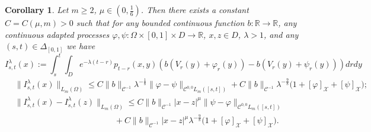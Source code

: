 \documentclass[12pt]{article}
\newtheorem{corollary}[theorem]{Corollary}
\theoremstyle{definition}
\DeclareMathOperator{\1}{\mathbbm{1}}%
\def\phi{\varphi}
\renewcommand{\ge}{\geqslant}
\renewcommand{\le}{\leqslant}
\newcommand{\nn}{\nonumber}
\newcommand{\C}{\mathcal{C}}
\newcommand{\R}{\mathbb{R}}
\newcommand{\X}{\mathcal{X}}
\begin{document}
\begin{corollary}\label{c:finfin}
Let  $m\ge2$, $\mu\in(0,\frac16)$. Then there exists a constant $C=C(\mu,m)>0$ such that for any bounded continuous function $b\colon\R\to\R$, any continuous adapted processes  $\phi,\psi \colon\Omega\times[0,1]\times D\to\R$, $x,z\in D$, $\lambda>1$, and any  $(s,t)\in\Delta_{[0,1]}$ we have
\[
I_{s,t}^\lambda(x):=\int_s^t\int_ D e^{-\lambda(t-r)}p_{t-r}(x,y)\left(b( V_r(y)+\phi_r(y))- b( V_r(y)+\psi_r(y))\right)drd y
\]
\begin{align}\label{keylam}
&\|I_{s,t}^\lambda(x)\|_{L_m(\Omega)}\le 
C \|b\|_{\C^{-1}}                                                                                                                                               \lambda^{-\frac18}\|\phi-\psi\|_{\C^{0,0}L_m([s,t])}+C \|b\|_{\C^{-1}}\lambda^{-\frac{9}8}\bigl(1+[\phi]_{\X}+[\psi]_{\X}\bigr);\\
&\|I_{s,t}^\lambda(x)-I_{s,t}^\lambda(z)\|_{L_m(\Omega)}\le  C \|b\|_{\C^{-1}} |x-z|^\mu                                                                                                                                                      \|\psi-\phi\|_{\C^{0,0}L_m([s,t])}\nn\\
 &\qquad\qquad \qquad \qquad\qquad \qquad+ C \|b\|_{\C^{-1}}  |x-z|^\mu \lambda^{-\frac{9}8}\bigl(1+[\phi]_{\X}+[\psi]_{\X}\bigr). \label{holder}
\end{align}
\end{corollary}
\end{document}
